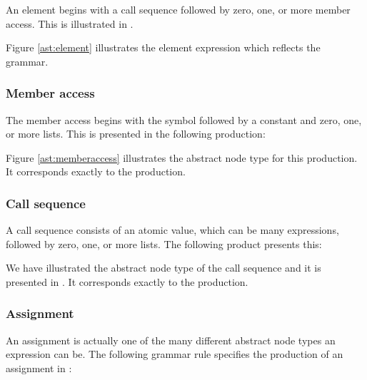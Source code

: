 An element begins with a call sequence followed by zero, one, or more member access. This is illustrated in .



Figure \ref{ast:element} illustrates the element expression which reflects the grammar.

\subsubsection{Member access}

The member access begins with the  symbol followed by a constant and zero, one, or more lists. This is presented in the following production:

\begin{ebnf}%
\end{ebnf}%

Figure \ref{ast:memberaccess} illustrates the abstract node type for this production. It corresponds exactly to the production.



\subsubsection{Call sequence}

A call sequence consists of an atomic value, which can be many expressions, followed by zero, one, or more lists. The following product presents this:

\begin{ebnf}%
\end{ebnf}%

We have illustrated the abstract node type of the call sequence and it is presented in . It corresponds exactly to the  production.



\subsubsection{Assignment}%

An assignment is actually one of the many different abstract node types an expression can be. The following grammar rule specifies the production of an assignment in \productname{}:%

